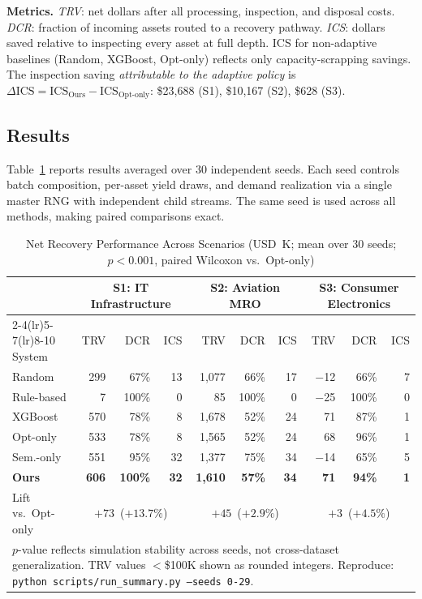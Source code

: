 \documentclass[conference]{IEEEtran}
\begin{document}
\smallskip\noindent\textbf{Metrics.}
\emph{TRV}: net dollars after all processing, inspection, and disposal costs.
\emph{DCR}: fraction of incoming assets routed to a recovery pathway.
\emph{ICS}: dollars saved relative to inspecting every asset at full depth.
ICS for non-adaptive baselines (Random, XGBoost, Opt-only) reflects only
capacity-scrapping savings. The inspection saving \emph{attributable to the
adaptive policy} is $\Delta\text{ICS} = \text{ICS}_\text{Ours} -
\text{ICS}_\text{Opt-only}$: \$23,688 (S1), \$10,167 (S2), \$628 (S3).

\subsection{Results}\label{sec:results}

Table~\ref{tab:main} reports results averaged over 30 independent seeds.
Each seed controls batch composition, per-asset yield draws, and demand
realization via a single master RNG with independent child streams. The same
seed is used across all methods, making paired comparisons exact.

\begin{table}[!t]
\caption{Net Recovery Performance Across Scenarios
  (USD~K; mean over 30 seeds; $p{<}0.001$, paired Wilcoxon vs.\ Opt-only)}
\label{tab:main}
\centering
\begin{tabular}{l *{3}{rr@{\hspace{4pt}}r}}
\toprule
 & \multicolumn{3}{c}{S1: IT Infrastructure}
 & \multicolumn{3}{c}{S2: Aviation MRO}
 & \multicolumn{3}{c}{S3: Consumer Electronics} \\
\cmidrule(lr){2-4}\cmidrule(lr){5-7}\cmidrule(lr){8-10}
System & TRV & DCR & ICS & TRV & DCR & ICS & TRV & DCR & ICS \\
\midrule
Random      &  299 & 67\%  & 13 & 1{,}077 & 66\% & 17 & $-$12 & 66\% &  7 \\
Rule-based  &    7 & 100\% &  0 &      85 &100\% &  0 & $-$25 &100\% &  0 \\
XGBoost     &  570 & 78\%  &  8 & 1{,}678 & 52\% & 24 &    71 & 87\% &  1 \\
Opt-only    &  533 & 78\%  &  8 & 1{,}565 & 52\% & 24 &    68 & 96\% &  1 \\
Sem.-only   &  551 & 95\%  & 32 & 1{,}377 & 75\% & 34 & $-$14 & 65\% &  5 \\
\textbf{Ours}
            & \textbf{606} & \textbf{100\%} & \textbf{32}
            & \textbf{1{,}610} & \textbf{57\%} & \textbf{34}
            & \textbf{71} & \textbf{94\%} & \textbf{1} \\
\midrule
Lift vs.\ Opt-only
 & \multicolumn{3}{c}{$+73$~($+13.7\%$)}
 & \multicolumn{3}{c}{$+45$~($+2.9\%$)}
 & \multicolumn{3}{c}{$+3$~($+4.5\%$)} \\
\bottomrule
\multicolumn{10}{l}{\footnotesize
  $p$-value reflects simulation stability across seeds, not cross-dataset
  generalization. TRV values $<$\$100K shown as rounded integers.
  Reproduce: \texttt{python scripts/run\_summary.py --seeds 0-29}.}
\end{tabular}
\end{table}
\end{document}
